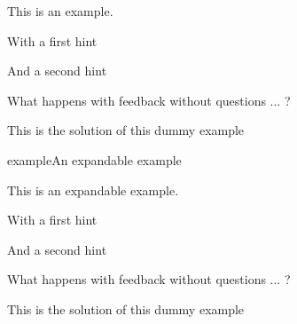 \documentclass{ximera}
\begin{document}

    \begin{example}
        
        This is an example.

        \begin{hint} With a first hint 
        \end{hint}

        \begin{hint} And a second hint
        \end{hint}

        \begin{feedback} What happens with feedback without questions ... ?
        \end{feedback}
        
        \begin{oplossing} This is the solution of this dummy example
        \end{oplossing}

    \end{example}

    \begin{expandable}{example}{An expandable example}
        
        This is an expandable example.

        \begin{hint} With a first hint 
        \end{hint}

        \begin{hint} And a second hint
        \end{hint}

        \begin{feedback} What happens with feedback without questions ... ?
        \end{feedback}
        
        \begin{oplossing} This is the solution of this dummy example
        \end{oplossing}

    \end{expandable}
\end{document}
